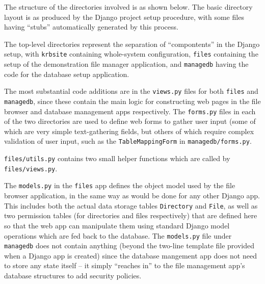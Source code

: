 \documentclass{article}
\begin{document}
The structure of the directories involved is as shown below. The basic directory layout is as produced by the Django project setup procedure, with some files having ``stubs'' automatically generated by this process.


The top-level directories represent the separation of ``compontents'' in the Django setup, with \texttt{krbsite} containing whole-system configuration, \texttt{files} containing the setup of the demonstration file manager application, and \texttt{managedb} having the code for the database setup application.

The most substantial code additions are in the \texttt{views.py} files for both \texttt{files} and \texttt{managedb}, since these contain the main logic for constructing web pages in the file browser and database management apps respectively. The \texttt{forms.py} files in each of the two directories are used to define web forms to gather user input (some of which are very simple text-gathering fields, but others of which require complex validation of user input, such as the \texttt{TableMappingForm} in \texttt{managedb/forms.py}.

\texttt{files/utils.py} contains two small helper functions which are called by \texttt{files/views.py}.

The \texttt{models.py} in the \texttt{files} app defines the object model used by the file browser application, in the same way as would be done for any other Django app. This includes both the actual data storage tables \texttt{Directory} and \texttt{File}, as well as two permission tables (for directories and files respectively) that are defined here so that the web app can manipulate them using standard Django model operations which are fed back to the database. The \texttt{models.py} file under \texttt{managedb} does not contain anything (beyond the two-line template file provided when a Django app is created) since the database mangement app does not need to store any state itself -- it simply ``reaches in'' to the file management app's database structures to add security policies.
\end{document}
